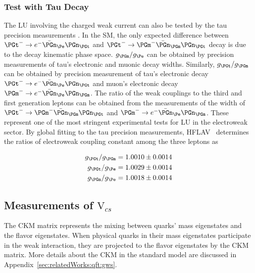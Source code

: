 \subsubsection{Test with Tau Decay}


The LU involving the charged weak current can also be tested by the tau precision measurements \cite{Pich:2013lsa,Amhis:2019ckw}. In the SM, the only expected difference between $\PGt^- \to e^- \bar{\PGn}_\Pe \PGn_\PGt$ and $\PGt^- \to \PGm^- \bar{\PGn}_\PGm \PGn_\PGt$  decay is due to the decay kinematic phase space. $g_\PGm  / g_\Pe $ can be obtained by precision measurements of tau's electronic and muonic decay widths. Similarly,  $g_\PGt  / g_\PGm $ can be obtained by precision measurement of tau's electronic decay $\PGt^- \to e^- \bar{\PGn}_\Pe \PGn_\PGt$ and muon's electronic decay $\PGm^- \to e^- \bar{\PGn}_\Pe \PGn_\PGm$.  The ratio of the weak couplings to the third and first generation leptons can be obtained from the measurements of the width of $\PGt^- \to \PGm^- \bar{\PGn}_\PGm \PGn_\PGt$  and $\PGm^- \to e^- \bar{\PGn}_\Pe \PGn_\PGm$.  These represent one of the most stringent experimental tests for LU in the electroweak sector. By global fitting to the tau precision measurements, HFLAV~\cite{Amhis:2019ckw} determines the ratios of electroweak coupling constant among the three leptons as 

\begin{align*}
    g_\PGt / g_\PGm &= 1.0010 \pm 0.0014 \\
    g_\PGt / g_\Pe   &= 1.0029 \pm 0.0014 \\
    g_\PGm  / g_\Pe   &= 1.0018 \pm 0.0014 
\end{align*}



\subsection{Measurements of $\mathrm{V}_{cs}$ }
\label{sec:introduction:relatedWorks:vcsMeasurements}

The CKM matrix represents the mixing between quarks' mass eigenstates and the flavor eigenstates. When physical quarks in their mass eigenstates participate in the weak interaction, they are projected to the flavor eigenstates by the CKM matrix. More details about the CKM in the standard model are discussed in Appendix~\ref{sec:relatedWorks:qft:gws}. 

